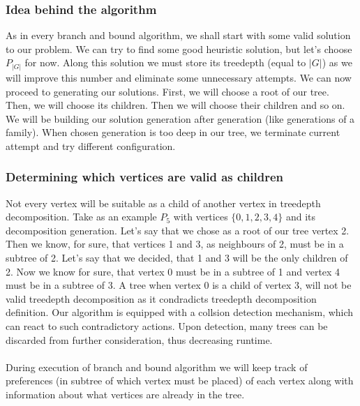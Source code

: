 \subsubsection{Idea behind the algorithm}
As in every branch and bound algorithm, we shall start with some valid solution to our problem. We can try to find some good heuristic solution, but let's choose $P_{\left|G\right|}$ for now. Along this solution we must store its treedepth (equal to $\left|G\right|$) as we will improve this number and eliminate some unnecessary attempts. We can now proceed to generating our solutions. First, we will choose a root of our tree. Then, we will choose its children. Then we will choose their children and so on. We will be building our solution generation after generation (like generations of a family). When chosen generation is too deep in our tree, we terminate current attempt and try different configuration.
\subsubsection{Determining which vertices are valid as children}
Not every vertex will be suitable as a child of another vertex in treedepth decomposition. Take as an example $P_5$ with vertices $\{ 0,1,2,3,4 \}$ and its decomposition generation. Let's say that we chose as a root of our tree vertex 2. Then we know, for sure, that vertices 1 and 3, as neighbours of 2, must be in a subtree of 2. Let's say that we decided, that 1 and 3 will be the only children of 2. Now we know for sure, that vertex 0 must be in a subtree of 1 and vertex 4 must be in a subtree of 3. A tree when vertex 0 is a child of vertex 3, will not be valid treedepth decomposition as it condradicts treedepth decomposition definition. Our algorithm is equipped with a collsion detection mechanism, which can react to such contradictory actions. Upon detection, many trees can be discarded from further consideration, thus decreasing runtime.\\\\
During execution of branch and bound algorithm we will keep track of preferences (in subtree of which vertex must be placed) of each vertex along with information about what vertices are already in the tree.
